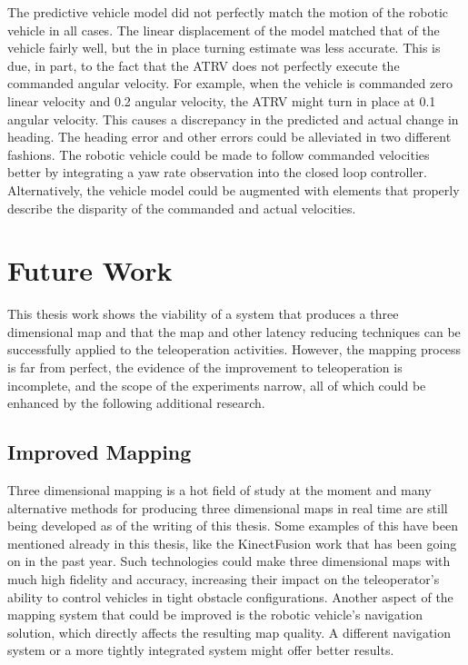 \documentclass[12pt]{report}
\begin{document}
The predictive vehicle model did not perfectly match the motion of the robotic vehicle in all cases.  The linear displacement of the model matched that of the vehicle fairly well, but the in place turning estimate was less accurate.  This is due, in part, to the fact that the ATRV does not perfectly execute the commanded angular velocity.  For example, when the vehicle is commanded zero linear velocity and 0.2 angular velocity, the ATRV might turn in place at 0.1 angular velocity.  This causes a discrepancy in the predicted and actual change in heading.  The heading error and other errors could be alleviated in two different fashions.  The robotic vehicle could be made to follow commanded velocities better by integrating a yaw rate observation into the closed loop controller.  Alternatively, the vehicle model could be augmented with elements that properly describe the disparity of the commanded and actual velocities.

\section{Future Work}
This thesis work shows the viability of a system that produces a three dimensional map and that the map and other latency reducing techniques can be successfully applied to the teleoperation activities.  However, the mapping process is far from perfect, the evidence of the improvement to teleoperation is incomplete, and the scope of the experiments narrow, all of which could be enhanced by the following additional research.

\subsection{Improved Mapping}
Three dimensional mapping is a hot field of study at the moment and many alternative methods for producing three dimensional maps in real time are still being developed as of the writing of this thesis.  Some examples of this have been mentioned already in this thesis, like the KinectFusion work that has been going on in the past year\cite{izadi2011kinectfusion}.  Such technologies could make three dimensional maps with much high fidelity and accuracy, increasing their impact on the teleoperator's ability to control vehicles in tight obstacle configurations.  Another aspect of the mapping system that could be improved is the robotic vehicle's navigation solution, which directly affects the resulting map quality.  A different navigation system or a more tightly integrated system might offer better results.
\end{document}
